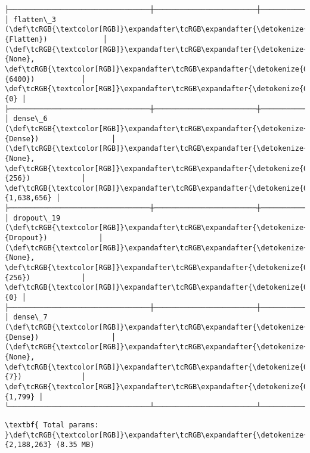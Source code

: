 \documentclass[11pt]{article}
\begin{document}
\begin{Verbatim}[commandchars=\\\{\}]
├─────────────────────────────────┼────────────────────────┼───────────────┤
│ flatten\_3 (\def\tcRGB{\textcolor[RGB]}\expandafter\tcRGB\expandafter{\detokenize{0,135,255}}{Flatten})             │ (\def\tcRGB{\textcolor[RGB]}\expandafter\tcRGB\expandafter{\detokenize{0,215,255}}{None}, \def\tcRGB{\textcolor[RGB]}\expandafter\tcRGB\expandafter{\detokenize{0,175,0}}{6400})           │             \def\tcRGB{\textcolor[RGB]}\expandafter\tcRGB\expandafter{\detokenize{0,175,0}}{0} │
├─────────────────────────────────┼────────────────────────┼───────────────┤
│ dense\_6 (\def\tcRGB{\textcolor[RGB]}\expandafter\tcRGB\expandafter{\detokenize{0,135,255}}{Dense})                 │ (\def\tcRGB{\textcolor[RGB]}\expandafter\tcRGB\expandafter{\detokenize{0,215,255}}{None}, \def\tcRGB{\textcolor[RGB]}\expandafter\tcRGB\expandafter{\detokenize{0,175,0}}{256})            │     \def\tcRGB{\textcolor[RGB]}\expandafter\tcRGB\expandafter{\detokenize{0,175,0}}{1,638,656} │
├─────────────────────────────────┼────────────────────────┼───────────────┤
│ dropout\_19 (\def\tcRGB{\textcolor[RGB]}\expandafter\tcRGB\expandafter{\detokenize{0,135,255}}{Dropout})            │ (\def\tcRGB{\textcolor[RGB]}\expandafter\tcRGB\expandafter{\detokenize{0,215,255}}{None}, \def\tcRGB{\textcolor[RGB]}\expandafter\tcRGB\expandafter{\detokenize{0,175,0}}{256})            │             \def\tcRGB{\textcolor[RGB]}\expandafter\tcRGB\expandafter{\detokenize{0,175,0}}{0} │
├─────────────────────────────────┼────────────────────────┼───────────────┤
│ dense\_7 (\def\tcRGB{\textcolor[RGB]}\expandafter\tcRGB\expandafter{\detokenize{0,135,255}}{Dense})                 │ (\def\tcRGB{\textcolor[RGB]}\expandafter\tcRGB\expandafter{\detokenize{0,215,255}}{None}, \def\tcRGB{\textcolor[RGB]}\expandafter\tcRGB\expandafter{\detokenize{0,175,0}}{7})              │         \def\tcRGB{\textcolor[RGB]}\expandafter\tcRGB\expandafter{\detokenize{0,175,0}}{1,799} │
└─────────────────────────────────┴────────────────────────┴───────────────┘

    \end{Verbatim}

    
    
    \begin{Verbatim}[commandchars=\\\{\}]
\textbf{ Total params: }\def\tcRGB{\textcolor[RGB]}\expandafter\tcRGB\expandafter{\detokenize{0,175,0}}{2,188,263} (8.35 MB)

    \end{Verbatim}

    
    
\end{document}
